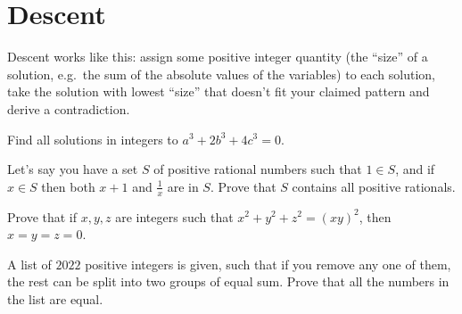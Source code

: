 \section{Descent}
Descent works like this: assign some positive integer quantity
(the ``size'' of a solution, e.g.\ the sum of the absolute values of the
variables) to each solution, take the solution with lowest
``size'' that doesn't fit your claimed pattern and derive a contradiction.
\begin{problem}{\label{p:n:n:d:1}}
    Find all solutions in integers to $a^3+2b^3+4c^3=0$.
\end{problem}
\begin{problem}{\label{p:n:n:d:2}}
    Let's say you have a set $S$ of positive rational numbers such that
      $1\in S$, and if $x\in S$ then both $x+1$ and $\frac 1x$ are in $S$. Prove
      that $S$ contains all positive rationals.
\end{problem}
\begin{problem}{\label{p:n:n:d:3}}
    Prove that if $x, y, z$ are integers such that $x^2+y^2+z^2=(xy)^2$,
      then $x=y=z=0$.
\end{problem}
\begin{problem}{\label{p:n:n:d:4}}
    A list of $2022$ positive integers is given, such that if you remove
      any one of them, the rest can be split into two groups of equal sum.
      Prove that all the numbers in the list are equal.
\end{problem}
